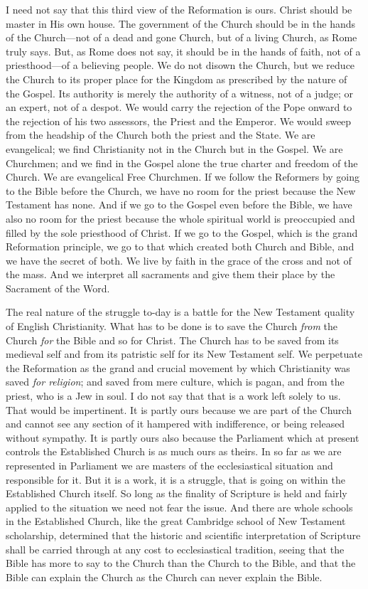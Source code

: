 \documentclass[12pt,a5paper,twoside]{book}
\begin{document}
I need not say that this third view of the Reformation 
is ours. Christ should be master in His own 
house. The government of the Church should be in 
the hands of the Church---not of a dead and gone 
Church, but of a living Church, as Rome truly says. 
But, as Rome does not say, it should be in the hands 
of faith, not of a priesthood---of a believing people. 
We do not disown the Church, but we reduce the 
Church to its proper place for the Kingdom as prescribed 
by the nature of the Gospel. Its authority is 
merely the authority of a witness, not of a judge; or 
an expert, not of a despot. We would carry the rejection 
of the Pope onward to the rejection of his 
two assessors, the Priest and the Emperor. We 
would sweep from the headship of the Church both 
the priest and the State. We are evangelical; we 
find Christianity not in the Church but in the Gospel. 
We are Churchmen; and we find in the Gospel alone 
the true charter and freedom of the Church. We 
are evangelical Free Churchmen. If we follow the 
Reformers by going to the Bible before the Church, 
we have no room for the priest because the New 
Testament has none. And if we go to the Gospel 
even before the Bible, we have also no room for the 
priest because the whole spiritual world is preoccupied 
and filled by the sole priesthood of Christ. If we 
go to the Gospel, which is the grand Reformation 
principle, we go to that which created both Church 
and Bible, and we have the secret of both. We live 
by faith in the grace of the cross and not of the mass. 
And we interpret all sacraments and give them their 
place by the Sacrament of the Word. 

The real nature of the struggle to-day is a battle 
for the New Testament quality of English Christianity. 
What has to be done is to save the Church 
\textit{from} the Church \textit{for} the Bible and so for Christ. 
The Church has to be saved from its medieval self and 
from its patristic self for its New Testament self. 
We perpetuate the Reformation as the grand and 
crucial movement by which Christianity was saved 
\textit{for religion}; and saved from mere culture, which is 
pagan, and from the priest, who is a Jew in soul. I 
do not say that that is a work left solely to us. That 
would be impertinent. It is partly ours because we 
are part of the Church and cannot see any section of 
it hampered with indifference, or being released without 
sympathy. It is partly ours also because the Parliament 
which at present controls the Established 
Church is as much ours as theirs. In so far as we 
are represented in Parliament we are masters of the 
ecclesiastical situation and responsible for it. But it 
is a work, it is a struggle, that is going on within the 
Established Church itself. So long as the finality of 
Scripture is held and fairly applied to the situation we 
need not fear the issue. And there are whole schools 
in the Established Church, like the great Cambridge 
school of New Testament scholarship, determined 
that the historic and scientific interpretation of Scripture 
shall be carried through at any cost to ecclesiastical tradition, seeing that the Bible has more to say 
to the Church than the Church to the Bible, and 
that the Bible can explain the Church as the Church 
can never explain the Bible. 
\end{document}
